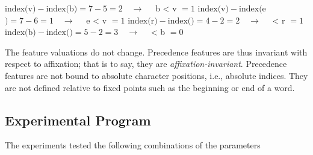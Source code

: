 \begin{exe}
    \ex \begin{xlist}
	\ex $\text{index}($\textsf{v}$) - \text{index}($\textsf{b}$) = 7 - 5 = 2 \quad\to\quad $ \textsf{b < v} $ =1 $
	\ex $\text{index}($\textsf{v}$) - \text{index}($\textsf{e}$) = 7 - 6 = 1 \quad\to\quad $ \textsf{e < v} $ =1 $
	\ex $\text{index}($\textsf{r}$) - \text{index}($\textsf{\textrevglotstop}$) = 4 - 2 = 2 \quad\to\quad $\textsf{ < r} $ =1 $
	\ex $\text{index}($\textsf{b}$) - \text{index}($\textsf{\textrevglotstop}$) = 5 - 2 = 3 \quad\to\quad $ \textsf{ < b} $ =0 $ 
    \end{xlist}
\end{exe}


The feature valuations do not change.
Precedence features are thus invariant with respect to affixation; that is to say, 
they are 
\emph{affixation-invariant}.
Precedence features are not bound to absolute character positions, i.e., 
absolute indices. They are not defined relative to fixed points such as 
the beginning or end of a word.

\subsection{Experimental Program}
The experiments tested the following combinations of the parameters 
